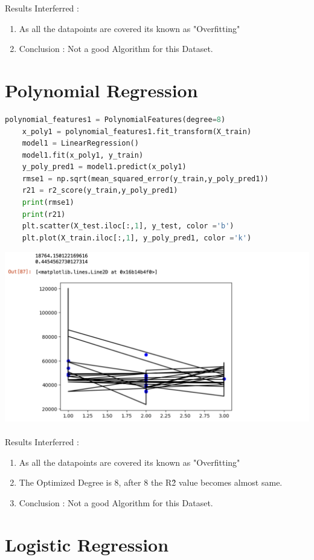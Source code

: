 \documentclass{article}
\begin{document}
Results Interferred :
\begin{enumerate}
	\item As all the datapoints are covered its known as "Overfitting"
	\item Conclusion : Not a good Algorithm for this Dataset.
\end{enumerate}

\section{Polynomial Regression}
\begin{lstlisting}[language= Python]
	polynomial_features1 = PolynomialFeatures(degree=8)
	x_poly1 = polynomial_features1.fit_transform(X_train)
	model1 = LinearRegression()
	model1.fit(x_poly1, y_train)
	y_poly_pred1 = model1.predict(x_poly1)
	rmse1 = np.sqrt(mean_squared_error(y_train,y_poly_pred1))
	r21 = r2_score(y_train,y_poly_pred1)
	print(rmse1)
	print(r21)
	plt.scatter(X_test.iloc[:,1], y_test, color ='b')
	plt.plot(X_train.iloc[:,1], y_poly_pred1, color ='k')
\end{lstlisting}

\includegraphics[scale=0.5]{images/6.png}\\\\
Results Interferred :
\begin{enumerate}
	\item As all the datapoints are covered its known as "Overfitting"
	\item The Optimized Degree is 8, after 8 the R\^2 value becomes almost same.
	\item Conclusion : Not a good Algorithm for this Dataset.

\end{enumerate}
	

\section{Logistic Regression}
\end{document}
